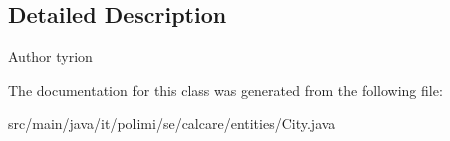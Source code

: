\subsection{Detailed Description}
\begin{DoxyAuthor}{Author}
tyrion 
\end{DoxyAuthor}


The documentation for this class was generated from the following file\+:\begin{DoxyCompactItemize}
\item 
src/main/java/it/polimi/se/calcare/entities/City.\+java\end{DoxyCompactItemize}
